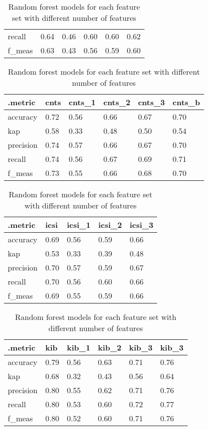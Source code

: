 \begin{table}[htbp]
\begin{tabular}{|l|lllll|}
  recall & 0.64 & 0.46 & 0.60 & 0.60 & 0.62 \\ 
  f\_meas & 0.63 & 0.43 & 0.56 & 0.59 & 0.60 \\ 
   \hline
\end{tabular}
\begin{tabular}{|l|lllll|}
  \hline
.metric & cnts & cnts\_1 & cnts\_2 & cnts\_3 & cnts\_b \\ 
  \hline
accuracy & 0.72 & 0.56 & 0.66 & 0.67 & 0.70 \\ 
  kap & 0.58 & 0.33 & 0.48 & 0.50 & 0.54 \\ 
  precision & 0.74 & 0.57 & 0.66 & 0.67 & 0.70 \\ 
  recall & 0.74 & 0.56 & 0.67 & 0.69 & 0.71 \\ 
  f\_meas & 0.73 & 0.55 & 0.66 & 0.68 & 0.70 \\ 
   \hline
\end{tabular}
\begin{tabular}{|l|llll|}
  \hline
.metric & icsi & icsi\_1 & icsi\_2 & icsi\_3 \\ 
  \hline
accuracy & 0.69 & 0.56 & 0.59 & 0.66 \\ 
  kap & 0.53 & 0.33 & 0.39 & 0.48 \\ 
  precision & 0.70 & 0.57 & 0.59 & 0.67 \\ 
  recall & 0.70 & 0.56 & 0.60 & 0.66 \\ 
  f\_meas & 0.69 & 0.55 & 0.59 & 0.66 \\ 
   \hline
\end{tabular}
\begin{tabular}{|l|lllll|}
  \hline
.metric & kib & kib\_1 & kib\_2 & kib\_3 & kib\_3 \\ 
  \hline
accuracy & 0.79 & 0.56 & 0.63 & 0.71 & 0.76 \\ 
  kap & 0.68 & 0.32 & 0.43 & 0.56 & 0.64 \\ 
  precision & 0.80 & 0.55 & 0.62 & 0.71 & 0.76 \\ 
  recall & 0.80 & 0.53 & 0.60 & 0.72 & 0.77 \\ 
  f\_meas & 0.80 & 0.52 & 0.60 & 0.71 & 0.76 \\ 
   \hline
\end{tabular}

\caption{Random forest models for each feature set with different number of features} 
\label{tab:random forest_allstat}
\end{table}
